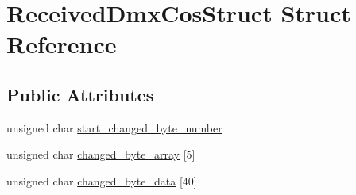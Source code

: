 \hypertarget{struct_received_dmx_cos_struct}{\section{Received\-Dmx\-Cos\-Struct Struct Reference}
\label{struct_received_dmx_cos_struct}
}
\subsection*{Public Attributes}
\begin{DoxyCompactItemize}
\item 
unsigned char \hyperlink{struct_received_dmx_cos_struct_a4cf39b60236997522f11155b63b2f090}{start\-\_\-changed\-\_\-byte\-\_\-number}
\item 
unsigned char \hyperlink{struct_received_dmx_cos_struct_a863941290eeb0f634dd83aa8a2389718}{changed\-\_\-byte\-\_\-array} \mbox{[}5\mbox{]}
\item 
unsigned char \hyperlink{struct_received_dmx_cos_struct_aa3984590d4af300c37c465375dd7ba0f}{changed\-\_\-byte\-\_\-data} \mbox{[}40\mbox{]}
\end{DoxyCompactItemize}


